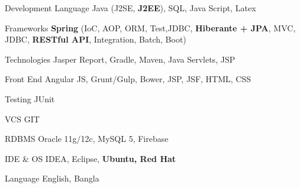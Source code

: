 




\begin{cvskills}
	
	\cvskill
	{Development Language} %
	{Java (J2SE, \textbf{J2EE}), SQL, Java Script, Latex} %
	
	
	\cvskill
	{Frameworks} %
	{\textbf{Spring} (IoC, AOP, ORM, Test,JDBC, \textbf{Hiberante + JPA}, MVC, JDBC, \textbf{RESTful API}, Integration, Batch, Boot)} %
	
	\cvskill
	{Technologies} %
	{Jasper Report, Gradle, Maven, Java Servlets, JSP} %
	
	\cvskill
	{Front End} %
	{ Angular JS, Grunt/Gulp, Bower, JSP, JSF, HTML, CSS} %
	
	\cvskill
	{Testing} %
	{JUnit} %
	
	\cvskill
	{VCS} %
	{GIT} %
	
	\cvskill
	{RDBMS} %
	{Oracle 11g/12c, MySQL 5, Firebase} %
	
	\cvskill
	{IDE \& OS} %
	{IDEA, Eclipse, \textbf{Ubuntu, Red Hat}} %
	
	
	
	\cvskill
	{Language} %
	{English, Bangla} %
	
\end{cvskills}
